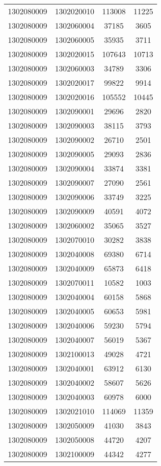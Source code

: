 \begin{longtable}{llcc}
1302080009 & 1302020010 & 113008 & 11225\\
1302080009 & 1302060004 & 37185 & 3605\\
1302080009 & 1302060005 & 35935 & 3711\\
1302080009 & 1302020015 & 107643 & 10713\\
1302080009 & 1302060003 & 34789 & 3306\\
1302080009 & 1302020017 & 99822 & 9914\\
1302080009 & 1302020016 & 105552 & 10445\\
1302080009 & 1302090001 & 29696 & 2820\\
1302080009 & 1302090003 & 38115 & 3793\\
1302080009 & 1302090002 & 26710 & 2501\\
1302080009 & 1302090005 & 29093 & 2836\\
1302080009 & 1302090004 & 33874 & 3381\\
1302080009 & 1302090007 & 27090 & 2561\\
1302080009 & 1302090006 & 33749 & 3225\\
1302080009 & 1302090009 & 40591 & 4072\\
1302080009 & 1302060002 & 35065 & 3527\\
1302080009 & 1302070010 & 30282 & 3838\\
1302080009 & 1302040008 & 69380 & 6714\\
1302080009 & 1302040009 & 65873 & 6418\\
1302080009 & 1302070011 & 10582 & 1003\\
1302080009 & 1302040004 & 60158 & 5868\\
1302080009 & 1302040005 & 60653 & 5981\\
1302080009 & 1302040006 & 59230 & 5794\\
1302080009 & 1302040007 & 56019 & 5367\\
1302080009 & 1302100013 & 49028 & 4721\\
1302080009 & 1302040001 & 63912 & 6130\\
1302080009 & 1302040002 & 58607 & 5626\\
1302080009 & 1302040003 & 60978 & 6000\\
1302080009 & 1302021010 & 114069 & 11359\\
1302080009 & 1302050009 & 41030 & 3843\\
1302080009 & 1302050008 & 44720 & 4207\\
1302080009 & 1302100009 & 44342 & 4277\\

\end{longtable}
